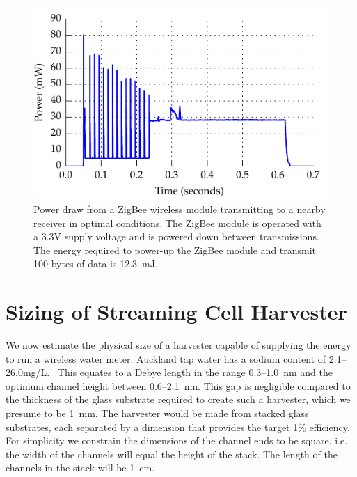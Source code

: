 \documentclass[10pt,final,journal]{IEEEtran}
\begin{document}
    \begin{figure}
        \begin{center}
        \includegraphics[width=\linewidth]{graph_XbeePower_reduced}
        \end{center}
        \caption{Power draw from a ZigBee wireless module transmitting to a nearby receiver in optimal conditions. The ZigBee module is operated with a 3.3V supply voltage and is powered down between transmissions. The energy required to power-up the ZigBee module and transmit 100 bytes of data is \SI{12.3}{\milli\joule}.}
        \label{fig:xbeePower}
    \end{figure}

    \section{Sizing of Streaming Cell Harvester}
    \label{sect:harvesterSize}
    We now estimate the physical size of a harvester capable of supplying the energy to run a wireless water meter.
    Auckland tap water has a sodium content of 2.1--26.0\thinspace mg/L.~\cite{WatercareNewZealand2012}
    This equates to a Debye length in the range 0.3--\SI{1.0}{\nano\meter} and the optimum channel height between 0.6--\SI{2.1}{\nano\meter}.
    This gap is negligible compared to the thickness of the glass substrate required to create such a harvester, which we presume to be \SI{1}{\milli\meter}.
    The harvester would be made from stacked glass substrates, each separated by a dimension that provides the target 1\% efficiency.
    For simplicity we constrain the dimensions of the channel ends to be square, i.e. the width of the channels will equal the height of the stack.
    The length of the channels in the stack will be \SI{1}{\centi\meter}.
    
\end{document}
